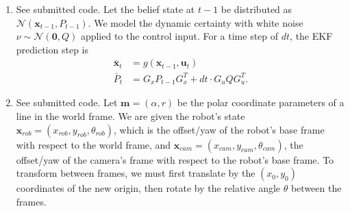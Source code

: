 \documentclass[12pt]{article}
\begin{document}
\begin{enumerate}
\begin{align*}
\begin{array}{cc}
		\sin(\theta_t) - \sin(\theta_{t-1}) & -\frac{V_t}{\omega_t}(\sin(\theta_t) - \sin(\theta_{t-1})) + V_t\cos(\theta_t)dt \\
		-\cos(\theta_t) + \cos(\theta_{t-1}) & \frac{V_t}{\omega_t}(\cos(\theta_t) - \cos(\theta_{t-1})) + V_t\sin(\theta_t)dt \\
		0 & \omega_tdt
		\end{array}\right).
	\end{align*}
	where $\theta_t := \theta_{t-1} + \omega_tdt$.
	\item See submitted code. Let the belief state at $t-1$ be distributed as $\mathcal{N}(\mathbf{x}_{t-1}, P_{t-1})$. We model the dynamic certainty with white noise $\nu \sim \mathcal{N}(\mathbf{0}, Q)$ applied to the control input. For a time step of $dt$, the EKF prediction step is
	\begin{align*}
		\bar{\mathbf{x}}_t &= g(\mathbf{x}_{t-1}, \mathbf{u}_t) \\
		\bar P_t &= G_xP_{t-1}G_x^T + dt \cdot G_uQG_u^T.
	\end{align*}
	\item See submitted code. Let $\mathbf{m} = (\alpha, r)$ be the polar coordinate parameters of a line in the world frame. We are given the robot's state $\mathbf{x}_{rob} = (x_{rob}, y_{rob}, \theta_{rob})$, which is the offset/yaw of the robot's base frame with respect to the world frame, and $\mathbf{x}_{cam} = (x_{cam}, y_{cam}, \theta_{cam})$, the offset/yaw of the camera's frame with respect to the robot's base frame. To transform between frames, we must first translate by the $(x_0,y_0)$ coordinates of the new origin, then rotate by the relative angle $\theta$ between the frames.
	

\end{enumerate}
\end{document}
